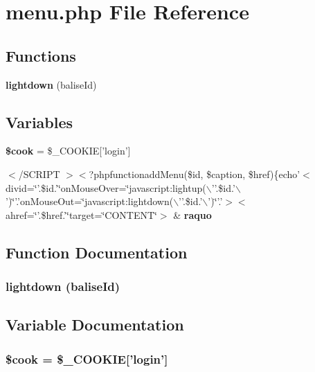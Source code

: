 \section{menu.php File Reference}
\label{menu_8php}


\subsection*{Functions}
\begin{CompactItemize}
\item 
{\bf lightdown} (balise\-Id)
\end{CompactItemize}
\subsection*{Variables}
\begin{CompactItemize}
\item 
{\bf \$cook} = \$\_\-COOKIE['login']
\item 
$<$/SCRIPT $>$$<$?phpfunctionadd\-Menu(\$id, \$caption, \$href)\{echo'$<$ divid=\char`\"{}'.\$id.'\char`\"{}on\-Mouse\-Over=\char`\"{}javascript:lightup($\backslash$''.\$id.'$\backslash$')\char`\"{}'.'on\-Mouse\-Out=\char`\"{}javascript:lightdown($\backslash$''.\$id.'$\backslash$')\char`\"{}'.'$>$$<$ ahref=\char`\"{}'.\$href.'\char`\"{}target=\char`\"{}CONTENT\char`\"{}$>$ \& {\bf raquo}
\end{CompactItemize}


\subsection{Function Documentation}
\subsubsection{\setlength{\rightskip}{0pt plus 5cm}lightdown (balise\-Id)}\label{menu_8php_cd2b1a8a2b68406287af1cda86141e5d}




\subsection{Variable Documentation}
\subsubsection{\setlength{\rightskip}{0pt plus 5cm}\$cook = \$\_\-COOKIE['login']}\label{menu_8php_ba7ee1ce52bafb9b3af8d03db6496ec9}


